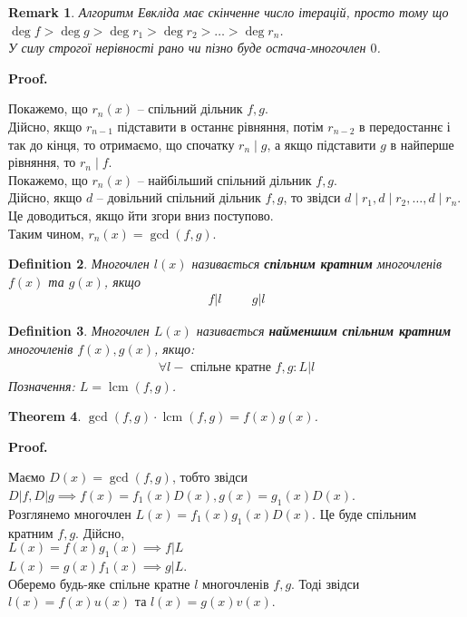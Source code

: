 \documentclass[a4paper, 10pt]{extarticle}
\makeatletter
\def\qed{$\blacksquare$}
\def\qed{$\blacksquare$}
\theoremstyle{theoremdd}
\newtheorem{theorem}{Theorem}[subsection]
\theoremstyle{theoremdd}
\newtheorem{definition}[theorem]{Definition}
\theoremstyle{theoremdd}
\theoremstyle{theoremdd}
\theoremstyle{theoremdd}
\theoremstyle{theoremdd}
\newtheorem{remark}[theorem]{Remark}
\theoremstyle{theoremdd}
\theoremstyle{theoremdd}
\renewenvironment{proof}[1][Proof.\\]{\par
\pushQED{\hfill \qed}%
\normalfont \topsep6\p@\@plus6\p@\relax
\trivlist
\item\relax
{\bfseries
#1\@addpunct{.}}\hspace\labelsep\ignorespaces
}{%
\popQED\endtrivlist\@endpefalse
}
\DeclareMathOperator{\lcm}{lcm}
\makeatother
\begin{document}
\begin{remark}
Алгоритм Евкліда має скінченне число ітерацій, просто тому що\\
$\deg f > \deg g > \deg r_1 > \deg r_2 > \dots > \deg r_n$.\\
У силу строгої нерівності рано чи пізно буде остача-многочлен $0$.
\end{remark}

\begin{proof}
Покажемо, що $r_n(x)$ -- спільний дільник $f,g$.\\
Дійсно, якщо $r_{n-1}$ підставити в останнє рівняння, потім $r_{n-2}$ в передостаннє і так до кінця, то отримаємо, що спочатку $r_n \mid g$, а якщо підставити $g$ в найперше рівняння, то $r_n \mid f$.\\
Покажемо, що $r_n(x)$ -- найбільший спільний дільник $f,g$.\\
Дійсно, якщо $d$ -- довільний спільний дільник $f,g$, то звідси $d \mid r_1, d \mid r_2, \dots, d \mid r_n$. Це доводиться, якщо йти згори вниз поступово.\\
Таким чином, $r_n(x) = \gcd(f,g)$.
\end{proof}

\iffalse
\begin{definition}
Многочлен $l(x)$ називається \textbf{спільним кратним} многочленів $f(x)$ та $g(x)$, якщо
\begin{align*}
f | l \hspace{1cm} g | l
\end{align*}
\end{definition}

\begin{definition}
Многочлен $L(x)$ називається \textbf{найменшим спільним кратним} многочленів $f(x),g(x)$, якщо:
\begin{align*}
\forall l - \text{ спільне кратне } f,g: L | l
\end{align*}
Позначення: $L = \lcm(f,g)$.
\end{definition}

\begin{theorem}
$\gcd (f,g) \cdot \lcm (f,g) = f(x)g(x)$.
\end{theorem}

\begin{proof}
Маємо $D(x) = \gcd(f,g)$, тобто звідси $D | f, D | g \implies f(x) = f_1(x)D(x), g(x) = g_1(x)D(x)$.\\
Розглянемо многочлен $L(x) = f_1(x)g_1(x)D(x)$. Це буде спільним кратним $f,g$. Дійсно,\\
$L(x) = f(x)g_1(x) \implies f | L$\\
$L(x) = g(x)f_1(x) \implies g | L$.\\
Оберемо будь-яке спільне кратне $l$ многочленів $f,g$. Тоді звідси $l(x) = f(x) u(x)$ та $l(x) = g(x) v(x)$.\\
\end{proof}
\end{document}
